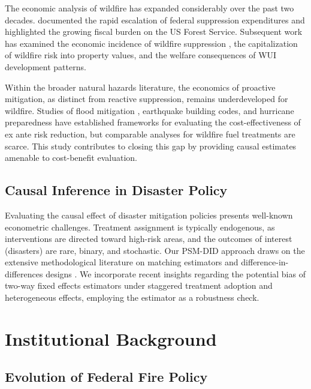 \documentclass[12pt, letterpaper]{article}
\begin{document}
The economic analysis of wildfire has expanded considerably over the past two decades. \citet{calkin2005} documented the rapid escalation of federal suppression expenditures and highlighted the growing fiscal burden on the US Forest Service. Subsequent work has examined the economic incidence of wildfire suppression \citep{baylis2023}, the capitalization of wildfire risk into property values, and the welfare consequences of WUI development patterns.

Within the broader natural hazards literature, the economics of proactive mitigation, as distinct from reactive suppression, remains underdeveloped for wildfire. Studies of flood mitigation \citep{kousky2014}, earthquake building codes, and hurricane preparedness have established frameworks for evaluating the cost-effectiveness of ex ante risk reduction, but comparable analyses for wildfire fuel treatments are scarce. This study contributes to closing this gap by providing causal estimates amenable to cost-benefit evaluation.

\subsection{Causal Inference in Disaster Policy}

Evaluating the causal effect of disaster mitigation policies presents well-known econometric challenges. Treatment assignment is typically endogenous, as interventions are directed toward high-risk areas, and the outcomes of interest (disasters) are rare, binary, and stochastic. Our PSM-DID approach draws on the extensive methodological literature on matching estimators \citep{rosenbaum1983, heckman1997} and difference-in-differences designs \citep{callaway2021, goodmanbacon2021}. We incorporate recent insights regarding the potential bias of two-way fixed effects estimators under staggered treatment adoption and heterogeneous effects, employing the \citet{callaway2021} estimator as a robustness check.


\section{Institutional Background}

\subsection{Evolution of Federal Fire Policy}
\end{document}
